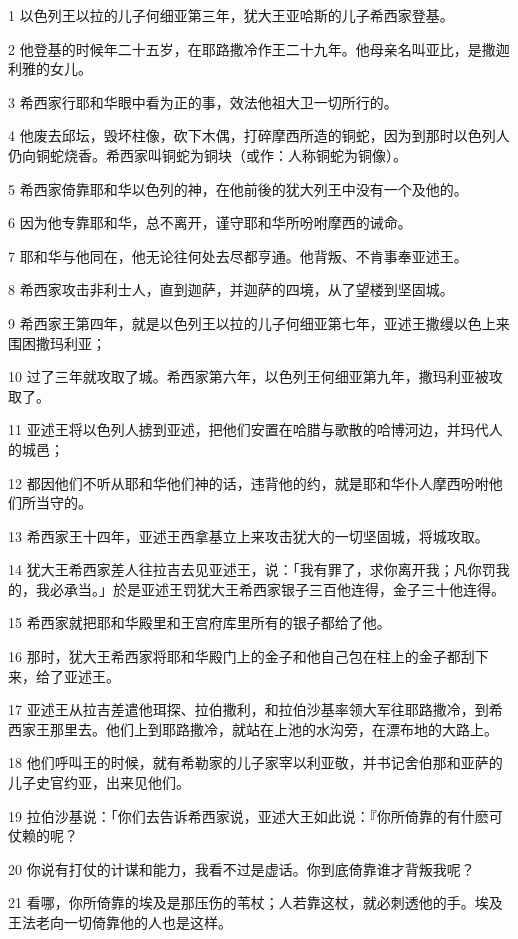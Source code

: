 \par 1 以色列王以拉的儿子何细亚第三年，犹大王亚哈斯的儿子希西家登基。
\par 2 他登基的时候年二十五岁，在耶路撒冷作王二十九年。他母亲名叫亚比，是撒迦利雅的女儿。
\par 3 希西家行耶和华眼中看为正的事，效法他祖大卫一切所行的。
\par 4 他废去邱坛，毁坏柱像，砍下木偶，打碎摩西所造的铜蛇，因为到那时以色列人仍向铜蛇烧香。希西家叫铜蛇为铜块（或作：人称铜蛇为铜像）。
\par 5 希西家倚靠耶和华以色列的神，在他前後的犹大列王中没有一个及他的。
\par 6 因为他专靠耶和华，总不离开，谨守耶和华所吩咐摩西的诫命。
\par 7 耶和华与他同在，他无论往何处去尽都亨通。他背叛、不肯事奉亚述王。
\par 8 希西家攻击非利士人，直到迦萨，并迦萨的四境，从了望楼到坚固城。
\par 9 希西家王第四年，就是以色列王以拉的儿子何细亚第七年，亚述王撒缦以色上来围困撒玛利亚；
\par 10 过了三年就攻取了城。希西家第六年，以色列王何细亚第九年，撒玛利亚被攻取了。
\par 11 亚述王将以色列人掳到亚述，把他们安置在哈腊与歌散的哈博河边，并玛代人的城邑；
\par 12 都因他们不听从耶和华他们神的话，违背他的约，就是耶和华仆人摩西吩咐他们所当守的。
\par 13 希西家王十四年，亚述王西拿基立上来攻击犹大的一切坚固城，将城攻取。
\par 14 犹大王希西家差人往拉吉去见亚述王，说：「我有罪了，求你离开我；凡你罚我的，我必承当。」於是亚述王罚犹大王希西家银子三百他连得，金子三十他连得。
\par 15 希西家就把耶和华殿里和王宫府库里所有的银子都给了他。
\par 16 那时，犹大王希西家将耶和华殿门上的金子和他自己包在柱上的金子都刮下来，给了亚述王。
\par 17 亚述王从拉吉差遣他珥探、拉伯撒利，和拉伯沙基率领大军往耶路撒冷，到希西家王那里去。他们上到耶路撒冷，就站在上池的水沟旁，在漂布地的大路上。
\par 18 他们呼叫王的时候，就有希勒家的儿子家宰以利亚敬，并书记舍伯那和亚萨的儿子史官约亚，出来见他们。
\par 19 拉伯沙基说：「你们去告诉希西家说，亚述大王如此说：『你所倚靠的有什麽可仗赖的呢？
\par 20 你说有打仗的计谋和能力，我看不过是虚话。你到底倚靠谁才背叛我呢？
\par 21 看哪，你所倚靠的埃及是那压伤的苇杖；人若靠这杖，就必刺透他的手。埃及王法老向一切倚靠他的人也是这样。
